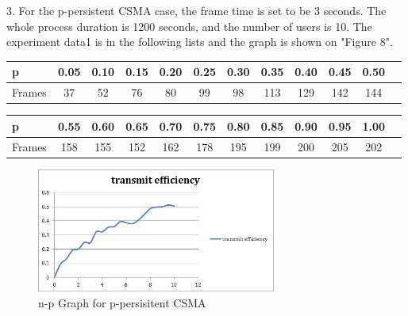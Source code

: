 \documentclass[11pt,a4paper]{report}
\begin{document}
3. For the p-persistent CSMA case, the frame time is set to be 3 seconds. The whole process duration is 1200 seconds, and the number of users is 10. The experiment data1 is in the following lists and the graph is shown on "Figure 8".
\begin{table}[htbp]
\begin{tabular}{lccccccccccc}
\toprule
p & 0.05 & 0.10 & 0.15  & 0.20 & 0.25 & 0.30 & 0.35 & 0.40 & 0.45 & 0.50 \\
\midrule
Frames & 37 & 52 & 76 & 80 & 99 & 98 & 113 & 129 & 142 & 144 \\
\bottomrule
\end{tabular}
\end{table}

\begin{table}[htbp]
\begin{tabular}{lccccccccccc}
\toprule
p & 0.55 & 0.60 & 0.65  & 0.70 & 0.75 & 0.80 & 0.85 & 0.90 & 0.95 & 1.00 \\
\midrule
Frames & 158 & 155 & 152 & 162 & 178 & 195 & 199 & 200 & 205 & 202 \\
\bottomrule
\end{tabular}
\end{table}

\begin{figure}
\centering
\includegraphics[width=0.7\textwidth]{3_4.jpg}
\caption{n-p Graph for p-persisitent CSMA}
\end{figure}
\end{document}
